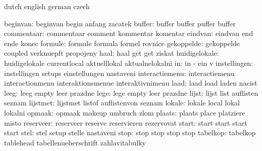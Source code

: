 \startelements        dutch                english             german
                      czech

           beginvan:  beginvan             begin               anfang
                      zacatek
             buffer:  buffer               buffer              puffer
                      buffer
         commentaar:  commentaar           comment             kommentar
                      komentar
            eindvan:  eindvan              end                 ende
                      konec
            formule:  formule              formula             formel
                      rovnice
         gekoppelde:  gekoppelde           coupled             verknuepft
                      propojeny
               haal:  haal                 get                 get
                      ziskat
      huidigelokale:  huidigelokale        currentlocal        aktuelllokal
                      aktualnelokalni
                 in:  in                   -                   ein
                      v %
       instellingen:  instellingen         setups              einstellungen
                      nastaveni
     interactiemenu:  interactiemenu       interactionmenu     interaktionsmenue
                      interaktivnimenu
               laad:  laad                 load                laden
                      nacist
               leeg:  leeg                 empty               leer
                      prazdne
               lege:  lege                 empty               leer
                      prazdne
              lijst:  lijst                list                auflisten
                      seznam
           lijstmet:  lijstmet             listof              auflistenvon
                      seznam
             lokale:  lokale               local               lokal
                      lokalni
             opmaak:  opmaak               makeup              umbruch
                      zlom
             plaats:  plaats               place               platziere
                      misto
          reserveer:  reserveer            reserve             reservieren
                      rezervovat
              start:  start                start               start
                      start
               stel:  stel                 setup               stelle
                      nastaveni
               stop:  stop                 stop                stop
                      stop
           tabelkop:  tabelkop             tablehead           tabellenueberschrift
                      zahlavitabulky
